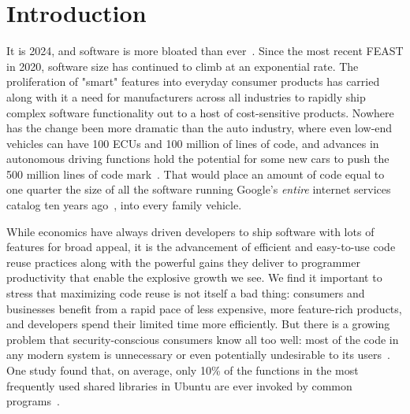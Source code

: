 \documentclass[sigconf]{acmart}
\begin{document}


\maketitle

\section{Introduction}
It is 2024, and software is more bloated than ever~\cite{hubert2024}.  Since the
most recent FEAST in 2020, software size has continued to climb at an
exponential rate. The proliferation of "smart" features into everyday consumer
products has carried along with it a need for manufacturers across all
industries to rapidly ship complex software functionality out to a host of
cost-sensitive products. Nowhere has the change been more dramatic than the auto
industry, where even low-end vehicles can have 100 ECUs and 100 million of lines
of code, and advances in autonomous driving functions hold the potential for
some new cars to push the 500 million lines of code mark~\cite{charette2021}.
That would place an amount of code equal to one quarter the size of all the
software running Google's \emph{entire} internet services catalog ten years
ago~\cite{potvin2015}, into every family vehicle.

While economics have always driven developers to ship software with lots of
features for broad appeal, it is the advancement of efficient and easy-to-use
code reuse practices along with the powerful gains they deliver to programmer
productivity that enable the explosive growth we see.  We find it important to
stress that maximizing code reuse is not itself a bad thing: consumers and
businesses benefit from a rapid pace of less expensive, more feature-rich
products, and developers spend their limited time more efficiently.  But there
is a growing problem that security-conscious consumers know all too well: most
of the code in any modern system is unnecessary or even potentially undesirable
to its users~\cite{quach2017}.  One study found that, on average, only 10\% of
the functions in the most frequently used shared libraries in Ubuntu are ever
invoked by common programs~\cite{quach2018}.
\end{document}
